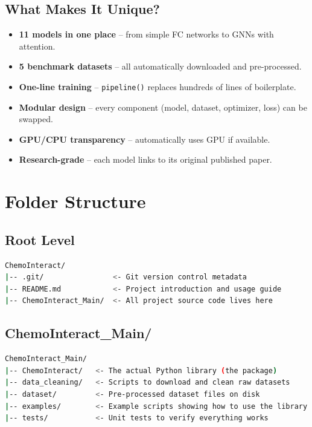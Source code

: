 \documentclass[12pt,a4paper,oneside]{book}
\begin{document}
\section{What Makes It Unique?}

\begin{itemize}
  \item \textbf{11 models in one place} -- from simple FC networks to GNNs with attention.
  \item \textbf{5 benchmark datasets} -- all automatically downloaded and pre-processed.
  \item \textbf{One-line training} -- \texttt{pipeline()} replaces hundreds of lines of boilerplate.
  \item \textbf{Modular design} -- every component (model, dataset, optimizer, loss) can be swapped.
  \item \textbf{GPU/CPU transparency} -- automatically uses GPU if available.
  \item \textbf{Research-grade} -- each model links to its original published paper.
\end{itemize}

\chapter{Folder Structure}\label{chap:folders}

\section{Root Level}

\begin{lstlisting}[language=bash]
ChemoInteract/
|-- .git/                <- Git version control metadata
|-- README.md            <- Project introduction and usage guide
|-- ChemoInteract_Main/  <- All project source code lives here
\end{lstlisting}

\section{ChemoInteract\_Main/}

\begin{lstlisting}[language=bash]
ChemoInteract_Main/
|-- ChemoInteract/   <- The actual Python library (the package)
|-- data_cleaning/   <- Scripts to download and clean raw datasets
|-- dataset/         <- Pre-processed dataset files on disk
|-- examples/        <- Example scripts showing how to use the library
|-- tests/           <- Unit tests to verify everything works
\end{lstlisting}
\end{document}
